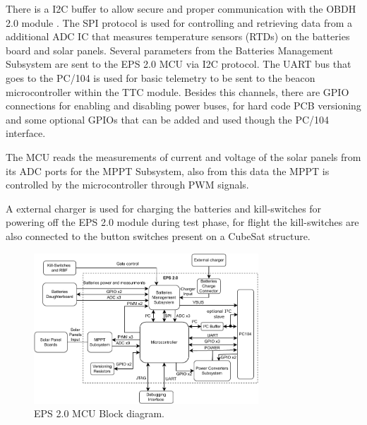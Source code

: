 There is a I2C buffer to allow secure and proper communication with the OBDH 2.0 module \cite{obdh2}.
The SPI protocol is used for controlling and retrieving data from a additional ADC IC that measures temperature sensors (RTDs) on the batteries board and solar panels.
Several parameters from the Batteries Management Subsystem are sent to the EPS 2.0 MCU via I2C protocol.
The UART bus that goes to the PC/104 is used for basic telemetry to be sent to the beacon microcontroller within the TTC module.
Besides this channels, there are GPIO connections for enabling and disabling power buses, for hard code PCB versioning and some optional GPIOs that can be added and used though the PC/104 interface. 

The MCU reads the measurements of current and voltage of the solar panels from its ADC ports for the MPPT Subsystem, also from this data the MPPT is controlled by the microcontroller through PWM signals.

A external charger is used for charging the batteries and kill-switches for powering off the EPS 2.0 module during test phase, for flight the kill-switches are also connected to the button switches present on a CubeSat structure.   

\begin{figure}[!ht]
    \begin{center}
        \includegraphics[width=0.75\textwidth]{figures/eps2_mcu_diagram.pdf}
        \caption{EPS 2.0 MCU Block diagram.}
        \label{fig:mcu-block-diagram}
    \end{center}
\end{figure}

